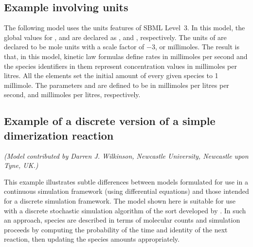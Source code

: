 \subsection{Example involving units}
\label{apdx:units-eg}

The following model uses the units features of SBML Level~3.  In
this model, the global values for ,
 and  are declared as ,
 and , respectively.  The units of
 are declared to be mole units with a scale
factor of $-3$, or millimoles.  The result is that, in this model,
kinetic law formulas define rates in millimoles per second and the
species identifiers in them represent concentration values in
millimoles per litres.  All the  elements set the
initial amount of every given species to 1 millimole.  The
parameters  and  are defined to be in millimoles
per litres per second, and millimoles per litres, respectively.



\subsection{Example of a discrete version of a simple dimerization reaction}
\label{sec:discrete-eg}

\emph{(Model contributed by Darren J. Wilkinson, Newcastle
  University, Newcastle upon Tyne, UK.)}

This example illustrates subtle differences between models
formulated for use in a continuous simulation framework (\eg using
differential equations) and those intended for a discrete
simulation framework.  The model shown here is suitable for use
with a discrete stochastic simulation algorithm of the sort
developed by \cite{gillespie:1977}.  In such an approach, species
are described in terms of molecular counts and simulation
proceeds by computing the probability of the time and identity of
the next reaction, then updating the species amounts
appropriately.

